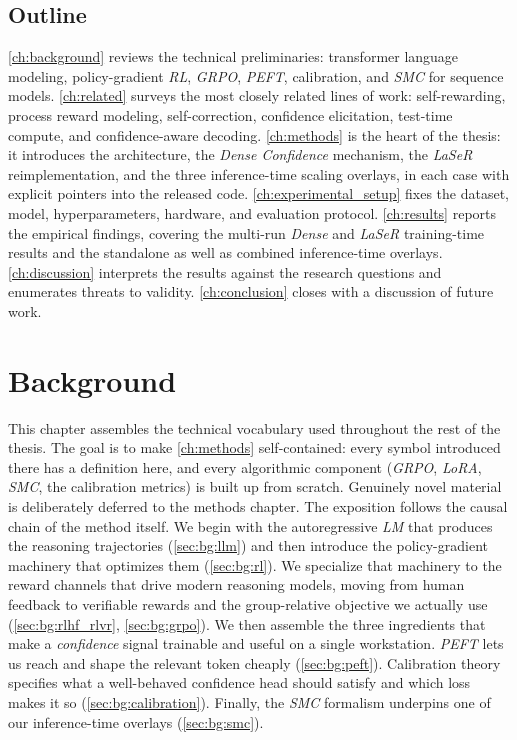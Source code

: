 \documentclass[a4paper,oneside,10pt,english]{scrbook}
\DeclareRobustCommand{\acfit}[1]{\textit{\ac{#1}}}
\begin{document}
\section{Outline}
\label{sec:intro:outline}

\autoref{ch:background} reviews the technical preliminaries: transformer language modeling, policy-gradient \acfit{RL}, \acfit{GRPO}, \acfit{PEFT}, calibration, and \acfit{SMC} for sequence models. \autoref{ch:related} surveys the most closely related lines of work: self-rewarding, process reward modeling, self-correction, confidence elicitation, test-time compute, and confidence-aware decoding. \autoref{ch:methods} is the heart of the thesis: it introduces the architecture, the \textit{Dense Confidence} mechanism, the \acfit{LaSeR} reimplementation, and the three inference-time scaling overlays, in each case with explicit pointers into the released code. \autoref{ch:experimental_setup} fixes the dataset, model, hyperparameters, hardware, and evaluation protocol. \autoref{ch:results} reports the empirical findings, covering the multi-run \textit{Dense} and \acfit{LaSeR} training-time results and the standalone as well as combined inference-time overlays. \autoref{ch:discussion} interprets the results against the research questions and enumerates threats to validity. \autoref{ch:conclusion} closes with a discussion of future work.

\cleardoubleoddpage
\chapter{Background}
\label{ch:background}

This chapter assembles the technical vocabulary used throughout the rest of the thesis. The goal is to make \autoref{ch:methods} self-contained: every symbol introduced there has a definition here, and every algorithmic component (\acfit{GRPO}, \acfit{LoRA}, \acfit{SMC}, the calibration metrics) is built up from scratch. Genuinely novel material is deliberately deferred to the methods chapter. The exposition follows the causal chain of the method itself. We begin with the autoregressive \acfit{LM} that produces the reasoning trajectories (\autoref{sec:bg:llm}) and then introduce the policy-gradient machinery that optimizes them (\autoref{sec:bg:rl}). We specialize that machinery to the reward channels that drive modern reasoning models, moving from human feedback to verifiable rewards and the group-relative objective we actually use (\autoref{sec:bg:rlhf_rlvr}, \autoref{sec:bg:grpo}). We then assemble the three ingredients that make a \emph{confidence} signal trainable and useful on a single workstation. \acfit{PEFT} lets us reach and shape the relevant token cheaply (\autoref{sec:bg:peft}). Calibration theory specifies what a well-behaved confidence head should satisfy and which loss makes it so (\autoref{sec:bg:calibration}). Finally, the \acfit{SMC} formalism underpins one of our inference-time overlays (\autoref{sec:bg:smc}).
\end{document}
